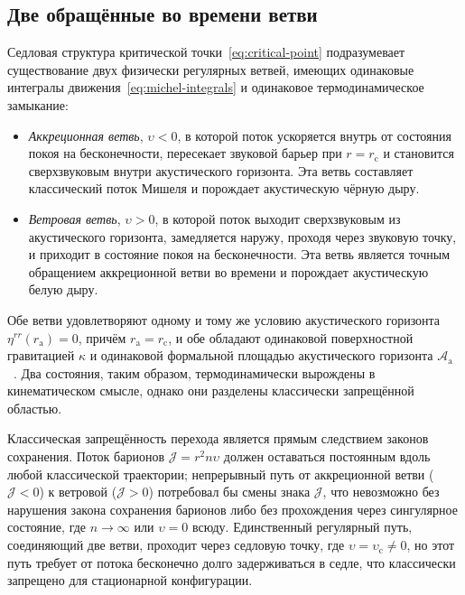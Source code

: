 \documentclass[12pt,a4paper,preprint]{elsarticle}
\begin{document}
        \subsection{Две обращённые во времени ветви}\label{subsec:two-branches}
            Седловая структура критической точки~\eqref{eq:critical-point} подразумевает существование двух физически регулярных ветвей, имеющих одинаковые интегралы движения~\eqref{eq:michel-integrals} и одинаковое термодинамическое замыкание:
            \begin{itemize}
                \item \emph{Аккреционная ветвь}, $\upsilon < 0$, в которой поток ускоряется внутрь от состояния покоя на бесконечности, пересекает звуковой барьер при $r = r_{\mathrm{c}}$ и становится сверхзвуковым внутри акустического горизонта. Эта ветвь составляет классический поток Мишеля и порождает акустическую чёрную дыру.
                \item \emph{Ветровая ветвь}, $\upsilon > 0$, в которой поток выходит сверхзвуковым из акустического горизонта, замедляется наружу, проходя через звуковую точку, и приходит в состояние покоя на бесконечности. Эта ветвь является точным обращением аккреционной ветви во времени и порождает акустическую белую дыру.
            \end{itemize}
            Обе ветви удовлетворяют одному и тому же условию акустического горизонта $\eta^{rr}(r_{\mathrm{a}}) = 0$, причём $r_{\mathrm{a}} = r_{\mathrm{c}}$, и обе обладают одинаковой поверхностной гравитацией $\kappa$ и одинаковой формальной площадью акустического горизонта $\mathcal{A}_{\mathrm{a}}$~\cite{SemyannikovAV_AcousticGeometryAndSoundRayDynamicsInRelativisticSphericalAccretion_2026}. Два состояния, таким образом, термодинамически вырождены в кинематическом смысле, однако они разделены классически запрещённой областью.
            
            Классическая запрещённость перехода является прямым следствием законов сохранения. Поток барионов $\mathcal{J} = r^{2} n \upsilon$ должен оставаться постоянным вдоль любой классической траектории; непрерывный путь от аккреционной ветви ($\mathcal{J} < 0$) к ветровой ($\mathcal{J} > 0$) потребовал бы смены знака $\mathcal{J}$, что невозможно без нарушения закона сохранения барионов либо без прохождения через сингулярное состояние, где $n \to \infty$ или $\upsilon = 0$ всюду. Единственный регулярный путь, соединяющий две ветви, проходит через седловую точку, где $\upsilon = \upsilon_{\mathrm{c}} \neq 0$, но этот путь требует от потока бесконечно долго задерживаться в седле, что классически запрещено для стационарной конфигурации.
            
\end{document}
